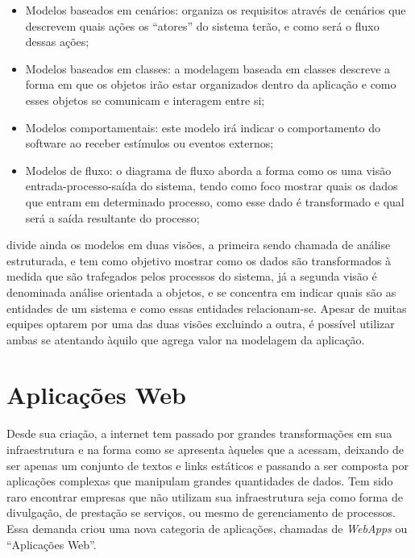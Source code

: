 \begin{itemize}
    \item Modelos baseados em cenários: organiza os requisitos através de cenários que descrevem quais ações os “atores” do sistema terão, e como será o fluxo dessas ações;
    \item Modelos baseados em classes: a modelagem baseada em classes descreve a forma em que os objetos irão estar organizados dentro da aplicação e como esses objetos se comunicam e interagem entre si;
    \item Modelos comportamentais:  este modelo irá indicar o comportamento do software ao receber estímulos ou eventos externos;
    \item Modelos de fluxo: o diagrama de fluxo aborda a forma como os uma visão entrada-processo-saída do sistema, tendo como foco mostrar quais os dados que entram em determinado processo, como esse dado é transformado e qual será a saída resultante do processo;
\end{itemize}

\cite{pressman2009engenharia} divide ainda os modelos em duas visões, a primeira sendo chamada de análise estruturada, e tem como objetivo mostrar como os dados são transformados à medida que são trafegados pelos processos do sistema, já a segunda visão é denominada análise orientada a objetos, e se concentra em indicar quais são as entidades de um sistema e como essas entidades relacionam-se. Apesar de muitas equipes optarem por uma das duas visões excluindo a outra, é possível utilizar ambas se atentando àquilo que agrega valor na modelagem da aplicação.

\section{Aplicações Web}
\label{sec:aplicacoesWeb}

Desde sua criação, a internet tem passado por grandes transformações em sua infraestrutura e na forma como se apresenta àqueles que a acessam, deixando de ser apenas um conjunto de textos e links estáticos e passando a ser composta por aplicações complexas que manipulam grandes quantidades de dados. Tem sido raro encontrar empresas que não utilizam sua infraestrutura seja como forma de divulgação, de prestação se serviços, ou mesmo de gerenciamento de processos. Essa demanda criou uma nova categoria de aplicações, chamadas de \textit{WebApps} ou “Aplicações Web”.

